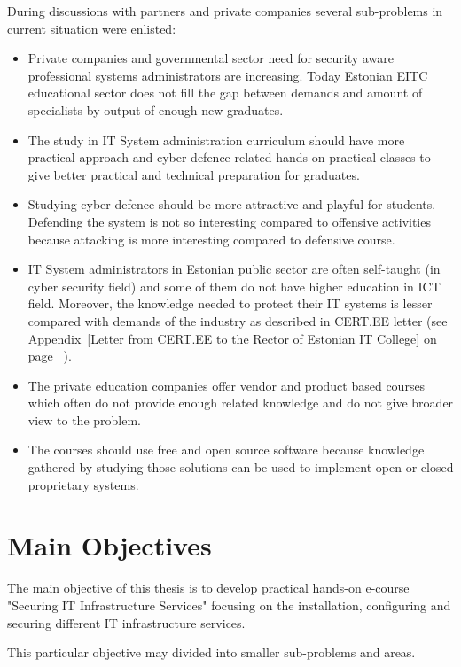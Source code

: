 During discussions with partners and private companies several sub-problems in current situation were enlisted:
\begin{itemize}
\item Private companies and governmental sector need for security aware professional systems administrators are increasing. Today Estonian \gls{EITC} educational sector does not fill the gap between demands and amount of specialists by output of enough new graduates.
\item The study in IT System administration curriculum should have more practical approach and cyber defence related hands-on practical classes to give better practical and technical preparation for graduates.
\item Studying cyber defence should be more attractive and playful for students. Defending the system is not so interesting compared to offensive activities because attacking is more interesting compared to defensive course.
\item IT System administrators in Estonian public sector are often self-taught (in cyber security field) and some of them do not have higher education in \gls{ICT} field. Moreover, the knowledge needed to protect their IT systems is lesser compared with demands of the industry as described in CERT.EE letter (see Appendix~\ref{Letter from CERT.EE to the Rector of Estonian IT College} on page ~\pageref{Letter from CERT.EE to the Rector of Estonian IT College}).
\item The private education companies offer vendor and product based courses which often do not provide enough related knowledge and do not give broader view to the problem.
\item The courses should use free and open source software because knowledge gathered by studying those solutions can be used to implement open or closed proprietary systems.
\end{itemize}

\section{Main Objectives}

The main objective of this thesis is to develop practical hands-on e-course "Securing IT Infrastructure Services" focusing on the installation, configuring and securing different IT infrastructure services.

This particular objective may divided into smaller sub-problems and areas.

